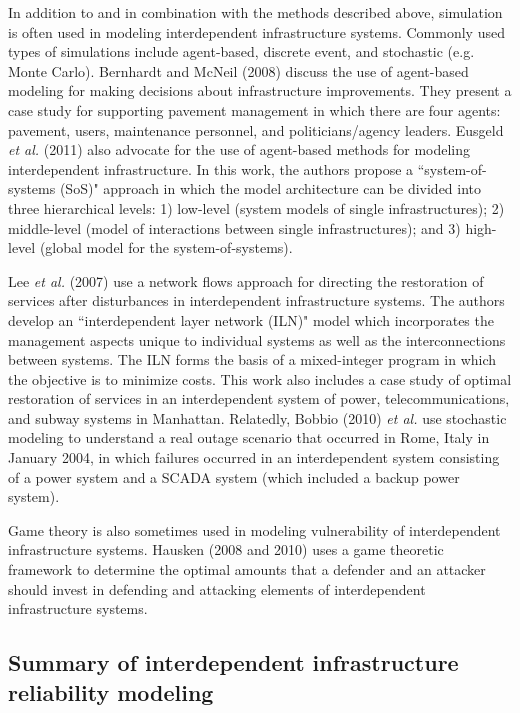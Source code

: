 In addition to and in combination with the methods described above, simulation is often used in modeling interdependent infrastructure systems. Commonly used types of simulations include agent-based, discrete event, and stochastic (e.g. Monte Carlo). Bernhardt and McNeil (2008)\cite{Bernhardt2008} discuss the use of agent-based modeling for making decisions about infrastructure improvements.  They present a case study for supporting pavement management in which there are four agents: pavement, users, maintenance personnel, and politicians/agency leaders.  Eusgeld \emph{et al.} (2011)\cite{Eusgeld2011} also advocate for the use of agent-based methods for modeling interdependent infrastructure.  In this work, the authors propose a ``system-of-systems (SoS)" approach in which the model architecture can be divided into three hierarchical levels: 1) low-level (system models of single infrastructures); 2) middle-level (model of interactions between single infrastructures); and 3) high-level (global model for the system-of-systems).

Lee \emph{et al.} (2007)\cite{Lee2007} use a network flows approach for directing the restoration of services after disturbances in interdependent infrastructure systems.  The authors develop an ``interdependent layer network (ILN)" model which incorporates the management aspects unique to individual systems as well as the interconnections between systems. The ILN forms the basis of a mixed-integer program in which the objective is to minimize costs.  This work also includes a case study of optimal restoration of services in an interdependent system of power, telecommunications, and subway systems in Manhattan.  Relatedly, Bobbio (2010) \emph{et al.} \cite{Bobbio2010} use stochastic modeling to understand a real outage scenario that occurred in Rome, Italy in January 2004, in which failures occurred in an interdependent system consisting of a power system and a SCADA system (which included a backup power system). 

Game theory is also sometimes used in modeling vulnerability of interdependent infrastructure systems.  Hausken (2008 and 2010)\cite{Hausken2008,Hausken2010} uses a game theoretic framework to determine the optimal amounts that a defender and an attacker should invest in defending and attacking elements of interdependent infrastructure systems.

\subsection{Summary of interdependent infrastructure reliability modeling}
\label{sec:ch1:interdependentreliability:summary}


